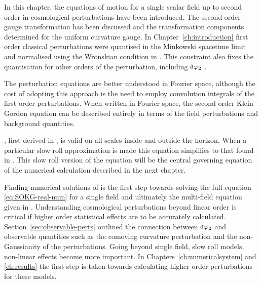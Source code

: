 In this chapter, the equations of motion for a single scalar
field
up to second order in cosmological perturbations have been introduced. The second
order gauge
transformation has been discussed and the transformation components determined for
the uniform curvature gauge.
% 
In Chapter~\ref{ch:introduction} first order classical perturbations were quantised
in the Minkowski spacetime limit and normalised using the Wronskian condition in
. This constraint also fixes the quantisation for other
orders of the perturbation, including $\delta\varphi_{2}$ \cite{Seery:2008qj}. 

The perturbation equations are better understood in Fourier space, although the cost
of adopting this approach is the need to employ convolution integrals of the first
order
perturbations. When written in Fourier space, the second order Klein-Gordon equation
can
be described entirely in terms of the field perturbations and background quantities. 

, first derived in , is valid on all scales
inside and outside the horizon. When a particular slow roll approximation is made
this equation simplifies to that found in . This slow roll
version of the equation will be the central governing equation of the numerical
calculation described in the next chapter.

Finding numerical solutions of  is the first step towards
solving the full equation \eqref{eq:SOKG-real-num} for a single field and
ultimately the multi-field equation given in . Understanding
cosmological perturbations beyond linear order is critical if higher order statistical
effects are to be accurately calculated. Section~\ref{sec:observable-perts}
outlined the connection between $\delta\varphi_{2}$ and observable quantities such as the
comoving curvature perturbation and the non-Gaussianity of the perturbations. Going
beyond single field, slow roll models, non-linear effects become more important. In
Chapters~\ref{ch:numericalsystem} and \ref{ch:results} the first step is taken
towards calculating higher order perturbations for these models.
